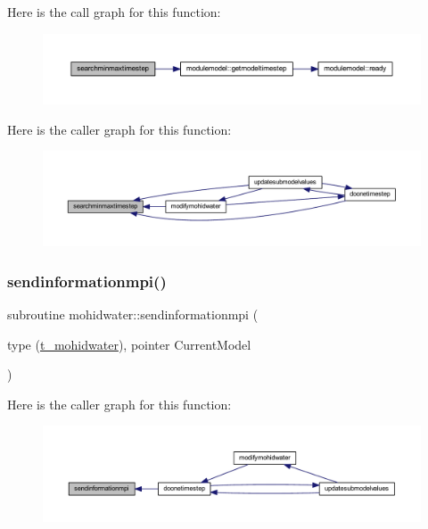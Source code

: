 Here is the call graph for this function\+:\nopagebreak
\begin{figure}[H]
\begin{center}
\leavevmode
\includegraphics[width=350pt]{_main_8_f90_a21af06ec88c487727156f8a6158380c6_cgraph}
\end{center}
\end{figure}
Here is the caller graph for this function\+:\nopagebreak
\begin{figure}[H]
\begin{center}
\leavevmode
\includegraphics[width=350pt]{_main_8_f90_a21af06ec88c487727156f8a6158380c6_icgraph}
\end{center}
\end{figure}
\mbox{\label{_main_8_f90_a2d87b03d6958553abb9960de430dc290}} 
\subsubsection{\texorpdfstring{sendinformationmpi()}{sendinformationmpi()}}
{\footnotesize\ttfamily subroutine mohidwater\+::sendinformationmpi (\begin{DoxyParamCaption}\item[{type (\mbox{\hyperlink{structt__mohidwater}{t\+\_\+mohidwater}}), pointer}]{Current\+Model }\end{DoxyParamCaption})}

Here is the caller graph for this function\+:\nopagebreak
\begin{figure}[H]
\begin{center}
\leavevmode
\includegraphics[width=350pt]{_main_8_f90_a2d87b03d6958553abb9960de430dc290_icgraph}
\end{center}
\end{figure}
\mbox{\label{_main_8_f90_a9860c624aeb5adadafab3c941c17395e}} 
